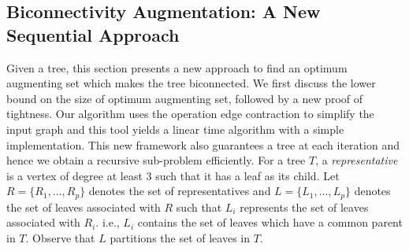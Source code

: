 \documentclass[runningheads]{llncs}
\begin{document}
\subsection{Biconnectivity Augmentation: A New Sequential Approach}
Given a tree, this section presents a new approach to find an optimum augmenting set which makes the tree biconnected.  We first discuss the lower bound on the size of optimum augmenting set, followed by a new proof of tightness.  Our algorithm uses the operation edge contraction to simplify the input graph and this tool yields a linear time algorithm with a simple implementation. 
This new framework also guarantees a tree at each iteration and hence we obtain a recursive sub-problem efficiently.  For a tree $T$, a {\em representative} is a vertex of degree at least 3 such that it has a leaf as its child.  Let $R=\{R_1,\ldots,R_p\}$ denotes the set of representatives and $L=\{L_1,\ldots,L_p\}$ denotes the set of leaves associated with $R$ such that $L_i$ represents the set of leaves associated with $R_i$.  i.e., $L_i$ contains the set of leaves which have a common parent in $T$. Observe that $L$ partitions the set of leaves in $T$.
\end{document}
